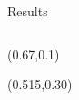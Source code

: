 \documentclass{beamer}
\begin{document}
\begin{frame}{Results}
\begin{columns}
\begin{center}
\begin{textblock}{0.48}
\end{textblock}
\begin{textblock}{0.2}(0.67,0.1)
\end{textblock}
%
\begin{textblock}{0.48}(0.515,0.30)

\end{textblock}
\end{center}
\end{columns}
\end{frame}
\end{document}

